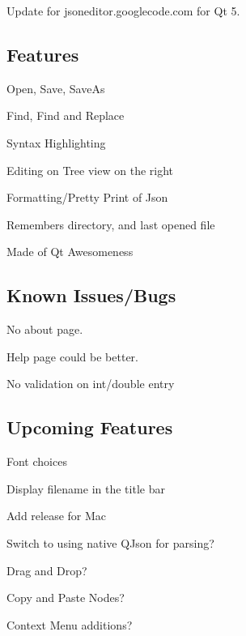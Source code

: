 Update for jsoneditor.\+googlecode.\+com for Qt 5.



\subsection*{Features }


\begin{DoxyItemize}
\item Open, Save, Save\+As
\item Find, Find and Replace
\item Syntax Highlighting
\item Editing on Tree view on the right
\item Formatting/\+Pretty Print of Json
\item Remembers directory, and last opened file
\item Made of Qt Awesomeness
\end{DoxyItemize}

\subsection*{Known Issues/\+Bugs }


\begin{DoxyItemize}
\item No about page.
\item Help page could be better.
\item No validation on int/double entry
\end{DoxyItemize}

\subsection*{Upcoming Features }


\begin{DoxyItemize}
\item Font choices
\item Display filename in the title bar
\item Add release for Mac
\item Switch to using native Q\+Json for parsing?
\item Drag and Drop?
\item Copy and Paste Nodes?
\item Context Menu additions? 
\end{DoxyItemize}